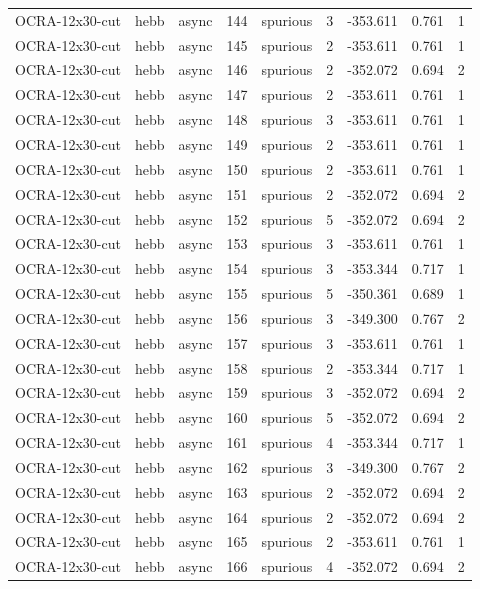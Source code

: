 \begin{tabular}{lllrlrrrr}
OCRA-12x30-cut & hebb & async & 144 & spurious & 3 & -353.611 & 0.761 & 1 \\
OCRA-12x30-cut & hebb & async & 145 & spurious & 2 & -353.611 & 0.761 & 1 \\
OCRA-12x30-cut & hebb & async & 146 & spurious & 2 & -352.072 & 0.694 & 2 \\
OCRA-12x30-cut & hebb & async & 147 & spurious & 2 & -353.611 & 0.761 & 1 \\
OCRA-12x30-cut & hebb & async & 148 & spurious & 3 & -353.611 & 0.761 & 1 \\
OCRA-12x30-cut & hebb & async & 149 & spurious & 2 & -353.611 & 0.761 & 1 \\
OCRA-12x30-cut & hebb & async & 150 & spurious & 2 & -353.611 & 0.761 & 1 \\
OCRA-12x30-cut & hebb & async & 151 & spurious & 2 & -352.072 & 0.694 & 2 \\
OCRA-12x30-cut & hebb & async & 152 & spurious & 5 & -352.072 & 0.694 & 2 \\
OCRA-12x30-cut & hebb & async & 153 & spurious & 3 & -353.611 & 0.761 & 1 \\
OCRA-12x30-cut & hebb & async & 154 & spurious & 3 & -353.344 & 0.717 & 1 \\
OCRA-12x30-cut & hebb & async & 155 & spurious & 5 & -350.361 & 0.689 & 1 \\
OCRA-12x30-cut & hebb & async & 156 & spurious & 3 & -349.300 & 0.767 & 2 \\
OCRA-12x30-cut & hebb & async & 157 & spurious & 3 & -353.611 & 0.761 & 1 \\
OCRA-12x30-cut & hebb & async & 158 & spurious & 2 & -353.344 & 0.717 & 1 \\
OCRA-12x30-cut & hebb & async & 159 & spurious & 3 & -352.072 & 0.694 & 2 \\
OCRA-12x30-cut & hebb & async & 160 & spurious & 5 & -352.072 & 0.694 & 2 \\
OCRA-12x30-cut & hebb & async & 161 & spurious & 4 & -353.344 & 0.717 & 1 \\
OCRA-12x30-cut & hebb & async & 162 & spurious & 3 & -349.300 & 0.767 & 2 \\
OCRA-12x30-cut & hebb & async & 163 & spurious & 2 & -352.072 & 0.694 & 2 \\
OCRA-12x30-cut & hebb & async & 164 & spurious & 2 & -352.072 & 0.694 & 2 \\
OCRA-12x30-cut & hebb & async & 165 & spurious & 2 & -353.611 & 0.761 & 1 \\
OCRA-12x30-cut & hebb & async & 166 & spurious & 4 & -352.072 & 0.694 & 2 \\

\end{tabular}

